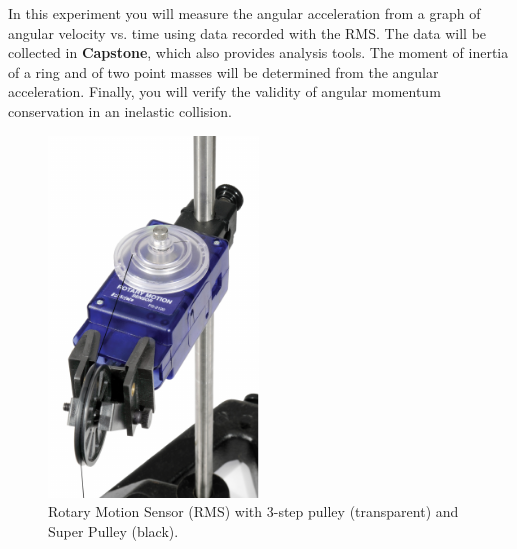 In this experiment you will measure the angular acceleration from a graph of angular velocity vs. time using data recorded with the RMS. The data will be collected in \textbf{Capstone}, which also provides analysis tools. %
The moment of inertia of a ring and of two point masses will be determined from the angular acceleration. Finally, you will verify the validity of angular momentum conservation in an inelastic collision.

\begin{figure}
  \begin{center}
    \includegraphics[width=2.2in]{Experiment09Figures/Figure02.pdf}
  \end{center}
  \caption{Rotary Motion Sensor (RMS) with 3-step pulley (transparent) and Super Pulley (black).}
  \label{M08Fig02}
\end{figure}


